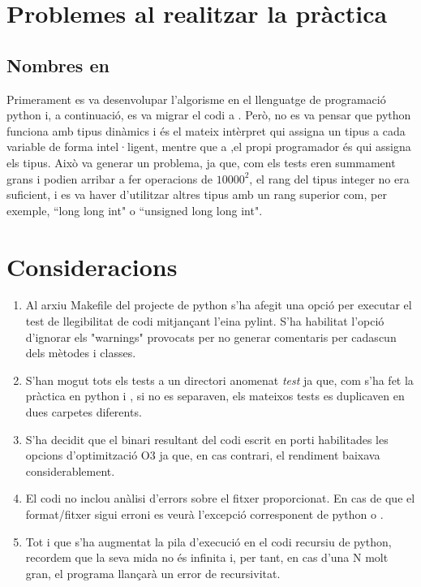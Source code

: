 \documentclass[12pt, letterpaper]{article}
\begin{document}
\section{Problemes al realitzar la pràctica}
\subsection{Nombres en \cpluspluslogo}
Primerament es va desenvolupar l'algorisme en el llenguatge de programació python i, a continuació, es va migrar el codi a \cpluspluslogo. 
Però, no es va pensar que python funciona amb tipus dinàmics i és el mateix intèrpret qui assigna un tipus a cada variable de forma intel·ligent,
mentre que a \cpluspluslogo  ,\space el propi programador és qui assigna els tipus. Això va generar un problema, ja que, com els tests eren summament grans i
podien arribar a fer operacions de $10000^{2}$, el rang del tipus integer no era suficient, i es va haver d'utilitzar altres tipus amb un rang superior com, per exemple,
``long long int" o ``unsigned long long int".

\section{Consideracions}
\begin{enumerate}
\item Al arxiu Makefile del projecte de python s'ha afegit una opció per executar el test de llegibilitat de codi mitjançant l'eina pylint. S'ha habilitat l'opció d'ignorar els "warnings" provocats per no generar
    comentaris per cadascun dels mètodes i classes.
\item S'han mogut tots els tests a un directori anomenat \textit{test} ja que, com s'ha fet la pràctica en python i \cpluspluslogo, si no es separaven, els mateixos tests es duplicaven en dues carpetes diferents. 
\item S'ha decidit que el binari resultant del codi escrit en \cpluspluslogo \space porti habilitades les opcions d'optimització O3 ja que, en cas contrari, el rendiment baixava considerablement.
\item El codi no inclou anàlisi d'errors sobre el fitxer proporcionat. En cas de que el format/fitxer sigui erroni es veurà l'excepció corresponent 
de python o \cpluspluslogo.
\item Tot i que s'ha augmentat la pila d'execució en el codi recursiu de python, recordem que la seva mida no és infinita i, per tant, en cas d'una N molt gran, el programa llançarà un error de recursivitat.
\end{enumerate}
\end{document}
